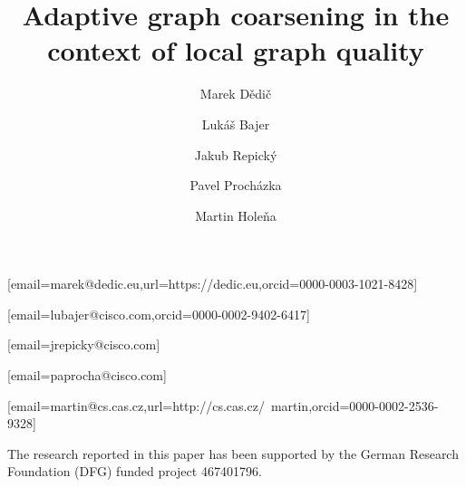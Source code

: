 





\title{Adaptive graph coarsening in the context of local graph quality}
\author[1,2]{Marek Dědič}[email=marek@dedic.eu,url=https://dedic.eu,orcid=0000-0003-1021-8428]
\cormark[1]
\author[2]{Lukáš Bajer}[email=lubajer@cisco.com,orcid=0000-0002-9402-6417]
\author[2]{Jakub Repický}[email=jrepicky@cisco.com]
\author[2]{Pavel Procházka}[email=paprocha@cisco.com]
\author[3]{Martin Holeňa}[email=martin@cs.cas.cz,url=http://cs.cas.cz/~martin,orcid=0000-0002-2536-9328]

\address[1]{Czech Technical University in Prague, Břehová 7, Prague, Czech Republic}
\address[2]{Cisco Systems, Inc., Karlovo náměstı́ 10, Prague, Czech Republic}
\address[3]{Institute of Computer Science, Czech Academy of Sciences, Pod vodárenskou věží 2, Prague, Czech Republic}




\maketitle








\begin{acknowledgments}
  The research reported in this paper has been supported by the German Research Foundation (DFG) funded project 467401796.
\end{acknowledgments}




